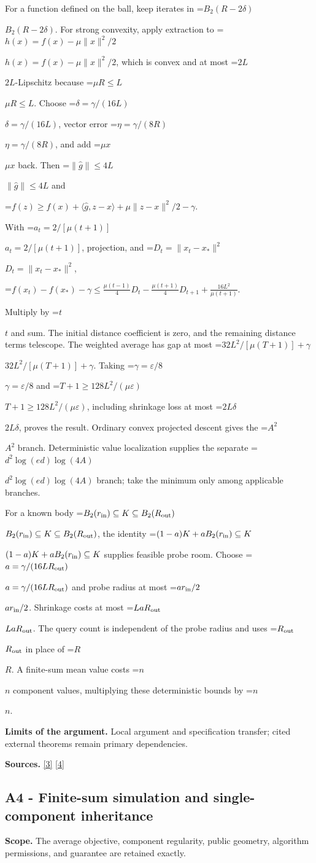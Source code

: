 \documentclass[10pt,a4paper]{article}
\newcommand{\AtlasMath}[1]{\par\begingroup\centering\setbox0=\hbox{$\displaystyle #1$}\ifdim\wd0>1.4\linewidth\typeout{ATLAS WIDE FORMULA: \the\wd0}\fi\ifdim\wd0>\linewidth\resizebox{\linewidth}{!}{\box0}\else\box0\fi\par\endgroup}
\newcommand{\AtlasInlineMath}[1]{\begingroup\setbox0=\hbox{$#1$}\ifdim\wd0>.4\linewidth\endgroup\AtlasMath{#1}\else\endgroup$#1$\fi}
\begin{document}
For a function defined on the ball, keep iterates in \AtlasInlineMath{B_2(R-2\delta)}. For strong convexity, apply extraction to \AtlasInlineMath{h(x)=f(x)-\mu\|x\|^2/2}, which is convex and at most \AtlasInlineMath{2L}-Lipschitz because \AtlasInlineMath{\mu R\le L}. Choose \AtlasInlineMath{\delta=\gamma/(16L)}, vector error \AtlasInlineMath{\eta=\gamma/(8R)}, and add \AtlasInlineMath{\mu x} back. Then \AtlasInlineMath{\|\widehat g\|\le4L} and

\AtlasMath{f(z)\ge f(x)+\langle\widehat g,z-x\rangle+\mu\|z-x\|^2/2-\gamma.}

With \AtlasInlineMath{a_t=2/[\mu(t+1)]}, projection, and \AtlasInlineMath{D_t=\|x_t-x_*\|^2},

\AtlasMath{f(x_t)-f(x_*)-\gamma\le\frac{\mu(t-1)}4D_t-\frac{\mu(t+1)}4D_{t+1}+\frac{16L^2}{\mu(t+1)}.}

Multiply by \AtlasInlineMath{t} and sum. The initial distance coefficient is zero, and the remaining distance terms telescope. The weighted average has gap at most \AtlasInlineMath{32L^2/[\mu(T+1)]+\gamma}. Taking \AtlasInlineMath{\gamma=\varepsilon/8} and \AtlasInlineMath{T+1\ge128L^2/(\mu\varepsilon)}, including shrinkage loss at most \AtlasInlineMath{2L\delta}, proves the result. Ordinary convex projected descent gives the \AtlasInlineMath{A^2} branch. Deterministic value localization supplies the separate \AtlasInlineMath{d^2\log(ed)\log(4A)} branch; take the minimum only among applicable branches.

For a known body \AtlasInlineMath{B_2(r_{\rm in})\subseteq K\subseteq B_2(R_{\rm out})}, the identity \AtlasInlineMath{(1-a)K+aB_2(r_{\rm in})\subseteq K} supplies feasible probe room. Choose \AtlasInlineMath{a=\gamma/(16LR_{\rm out})} and probe radius at most \AtlasInlineMath{ar_{\rm in}/2}. Shrinkage costs at most \AtlasInlineMath{LaR_{\rm out}}. The query count is independent of the probe radius and uses \AtlasInlineMath{R_{\rm out}} in place of \AtlasInlineMath{R}. A finite-sum mean value costs \AtlasInlineMath{n} component values, multiplying these deterministic bounds by \AtlasInlineMath{n}.

\textbf{Limits of the argument.} Local argument and specification transfer; cited external theorems remain primary dependencies.

\textbf{Sources.} \href{https://arxiv.org/html/2607.16558v2}{[3]} \href{https://www.mathnet.ru/php/archive.phtml?jrnid=mzm&option_lang=eng&paperid=1697&wshow=paper}{[4]}

\subsection{A4 - Finite-sum simulation and single-component inheritance}
\textbf{Scope.} The average objective, component regularity, public geometry, algorithm permissions, and guarantee are retained exactly.
\end{document}
